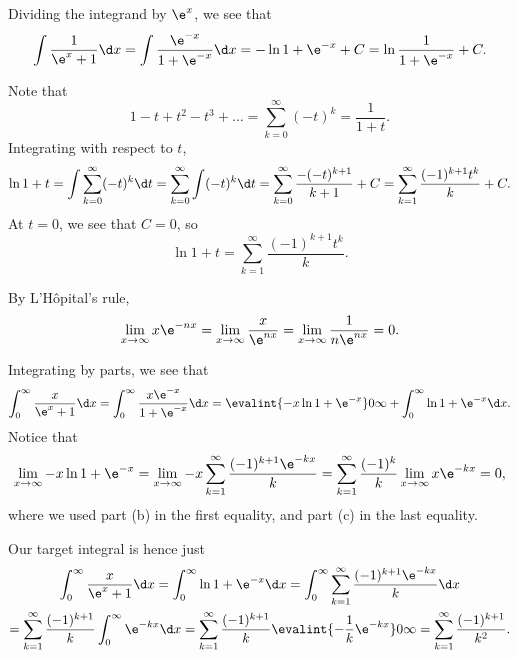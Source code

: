 \begin{solution}
    \begin{ppart}
        Dividing the integrand by $\e^x$, we see that \[\int \frac1{\e^x + 1} \d x = \int \frac{\e^{-x}}{1 + \e^{-x}} \d x = -\ln{1 + \e^{-x}} + C = \ln{\frac1{1 + \e^{-x}}} + C.\]
    \end{ppart}
    \begin{ppart}
        Note that \[1 - t + t^2 - t^3 + \dots = \sum_{k=0}^\infty (-t)^k = \frac1{1+t}.\] Integrating with respect to $t$, \[\ln{1 + t} = \int \sum_{k=0}^\infty (-t)^k \d t = \sum_{k = 0}^\infty \int (-t)^k \d t = \sum_{k = 0}^\infty \frac{-(-t)^{k+1}}{k+1} + C = \sum_{k = 1}^\infty \frac{(-1)^{k+1} t^k}{k} + C.\] At $t = 0$, we see that $C = 0$, so \[\ln{1 + t} = \sum_{k = 1}^\infty \frac{(-1)^{k+1} t^k}{k}.\]
    \end{ppart}
    \begin{ppart}
        By L'H\^{o}pital's rule, \[\lim_{x \to \infty} x\e^{-nx} = \lim_{x \to \infty} \frac{x}{\e^{nx}} = \lim_{x \to \infty} \frac{1}{n\e^{nx}} = 0.\]
    \end{ppart}
    \begin{ppart}
        Integrating by parts, we see that \[\int_0^\infty \frac{x}{\e^x + 1} \d x = \int_0^\infty \frac{x\e^{-x}}{1 + \e^{-x}} \d x = \evalint{-x\ln{1 + \e^{-x}}}0\infty + \int_0^\infty \ln{1 + \e^{-x}} \d x.\] Notice that \[\lim_{x \to \infty} -x\ln{1 + \e^{-x}} = \lim_{x \to \infty} -x\sum_{k = 1}^\infty \frac{(-1)^{k+1} \e^{-kx}}{k} = \sum_{k = 1}^\infty \frac{(-1)^k}{k} \lim_{x \to \infty} x\e^{-kx} = 0,\] where we used part (b) in the first equality, and part (c) in the last equality.

        Our target integral is hence just
        \begin{gather*}
            \int_0^\infty \frac{x}{\e^x + 1} \d x = \int_0^\infty \ln{1 + \e^{-x}} \d x = \int_0^\infty \sum_{k = 1}^\infty \frac{(-1)^{k+1} \e^{-kx}}{k} \d x\\
            = \sum_{k = 1}^\infty \frac{(-1)^{k+1}}{k} \int_0^\infty \e^{-kx} \d x = \sum_{k = 1}^\infty \frac{(-1)^{k+1}}{k} \evalint{-\frac1k \e^{-kx}}0\infty = \sum_{k = 1}^\infty \frac{(-1)^{k+1}}{k^2}.
        \end{gather*}
    \end{ppart}
\end{solution}